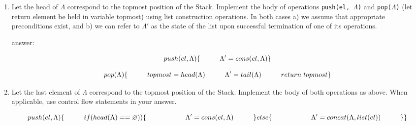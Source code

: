 \documentclass[12pt]{article}
\begin{document}
\begin{enumerate}

\item Let the head of $\Lambda$ correspond to the topmost position of the Stack. Implement the body of operations \texttt{push(el, $\Lambda$)} and \texttt{pop($\Lambda$)} (let return element be held in variable topmost) using list construction operations. In both cases a)  we assume that appropriate preconditions exist, and b) we can refer to $\Lambda'$ as the state of the list upon successful termination of one of its operations.

\noindent answer: 

\[
push(el, \Lambda) \{\\
\hspace{10mm} \Lambda' = cons(el, \Lambda)\\
\}
\]

\[
pop(\Lambda) \{\\
\hspace{10mm} topmost = head(\Lambda)\\
\hspace{10mm} \Lambda' = tail(\Lambda)\\
\hspace{10mm} return \hspace{1mm} topmost\\ 
\}
\]

\item  Let the last element of $\Lambda$ correspond to the topmost position of the Stack. Implement the body of both operations as above. When applicable, use control flow statements in your answer.

\[
push(el, \Lambda) \{\\
\hspace{10mm} if(head(\Lambda) == \varnothing)) \{\\
\hspace{20mm} \Lambda' = cons(el, \Lambda)\\
\hspace{10mm}\}  else \{\\
\hspace{20mm} \Lambda' = concat(\Lambda, list(el))\\
\hspace{10mm}\}\\
\}
\]


\end{enumerate}
\end{document}
